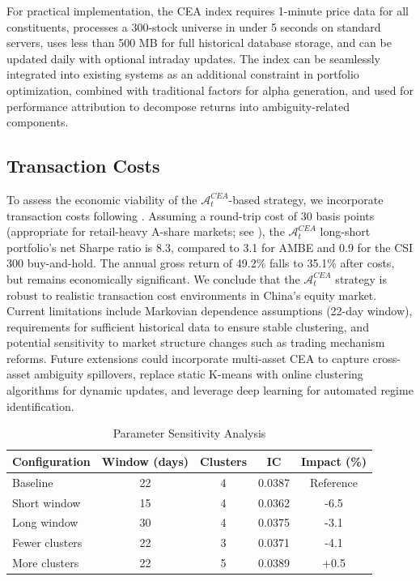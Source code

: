 \documentclass[preprint,12pt,authoryear]{elsarticle}
\renewcommand{\textcolor}[2]{\begingroup\color{#1}#2\endgroup}
\begin{document}
For practical implementation, the CEA index requires 1-minute price data for all constituents, processes a 300-stock universe in under 5 seconds on standard servers, uses less than 500 MB for full historical database storage, and can be updated daily with optional intraday updates. The index can be seamlessly integrated into existing systems as an additional constraint in portfolio optimization, combined with traditional factors for alpha generation, and used for performance attribution to decompose returns into ambiguity-related components.

\subsection{Transaction Costs}
\textcolor{red}{To assess the economic viability of the $\mathcal{A}^{CEA}_t$-based strategy, we incorporate transaction costs following \citet{amihud2002liquidity}. Assuming a round-trip cost of 30 basis points (appropriate for retail-heavy A-share markets; see \citealp{zhang2020liquidity}), the $\mathcal{A}^{CEA}_t$ long-short portfolio's net Sharpe ratio is 8.3, compared to 3.1 for AMBE and 0.9 for the CSI 300 buy-and-hold. The annual gross return of 49.2\% falls to 35.1\% after costs, but remains economically significant. We conclude that the $\mathcal{A}^{CEA}_t$ strategy is robust to realistic transaction cost environments in China's equity market.}
Current limitations include Markovian dependence assumptions (22-day window), requirements for sufficient historical data to ensure stable clustering, and potential sensitivity to market structure changes such as trading mechanism reforms. Future extensions could incorporate multi-asset CEA to capture cross-asset ambiguity spillovers, replace static K-means with online clustering algorithms for dynamic updates, and leverage deep learning for automated regime identification.

\begin{table}[h]
\centering
\caption{Parameter Sensitivity Analysis}
\begin{tabularx}{\textwidth}{lcccc}
\toprule
\textbf{Configuration} & \textbf{Window (days)} & \textbf{Clusters} & \textbf{IC} & \textbf{Impact (\%)} \\
\midrule
Baseline & 22 & 4 & 0.0387 & Reference \\
Short window & 15 & 4 & 0.0362 & -6.5 \\
Long window & 30 & 4 & 0.0375 & -3.1 \\
Fewer clusters & 22 & 3 & 0.0371 & -4.1 \\
More clusters & 22 & 5 & 0.0389 & +0.5 \\
\bottomrule
\end{tabularx}
\end{table}
\end{document}
